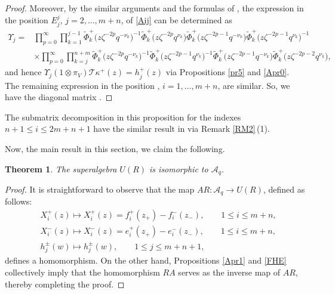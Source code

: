 \documentclass[pdftex]{sigma}
\numberwithin{equation}{section}
\newtheorem{Theorem}{Theorem}[section]
\begin{document}
\begin{proof}
Moreover, by the similar arguments and the formulas of ,
the expression in the position $E^j_j$, $j=2,\dots,m+n$, of \eqref{Aij} can be determined as
\begin{align*}
 \Upsilon_j={}&\prod\limits_{p=0}^{\infty}\prod\limits_{k=1}^{j-1}\widetilde{\Phi}^{+}_{k}\bigl(z\zeta^{-2p} q^{-\nu_k}\bigr)^{-1}\widetilde{\Phi}^{+}_{k}\bigl(z\zeta^{-2p} q^{\nu_k}\bigr)\widetilde{\Phi}^{+}_{k}\bigl(z\zeta^{-2p-1} q^{-\nu_k}\bigr)\widetilde{\Phi}^{+}_{k}\bigl(z\zeta^{-2p-1} q^{\nu_k}\bigr)^{-1}\\
&\times \prod\limits_{p=0}^{\infty}\prod\limits_{k=j}^{n+m}\widetilde{\Phi}^{+}_{k}\bigl(z\zeta^{-2p} q^{-\nu_k}\bigr)^{-1}\widetilde{\Phi}^{+}_{k}\bigl(z\zeta^{-2p-1} q^{\nu_k}\bigr)^{-1}\widetilde{\Phi}^{+}_{k}\bigl(z\zeta^{-2p-1} q^{-\nu_k}\bigr)\widetilde{\Phi}^{+}_{k}\bigl(z\zeta^{-2p-2} q^{\nu_k}\bigr),
\end{align*}
and hence
$\Upsilon_j(1\otimes\pi_V)\mathcal{T}\kappa^{+}(z)=h_j^{+}(z)
$
via Propositions \ref{pr5} and \ref{Apr0}.
The remaining expression in the position , $i=1,\dots,m+n$, are similar. So, we have the diagonal matrix .
\end{proof}

\begin{Remark}
The submatrix decomposition in this proposition for the indexes $n+1\leq i\leq 2m+n+1$ have the similar result in \cite{JMAB} via Remark \ref{RM2}\,(1).
\end{Remark}


Now, the main result in this section, we claim the following.

\begin{Theorem}\label{th4}
The superalgebra $U(R)$ is isomorphic to $\mathcal{A}_q$.
\end{Theorem}
\begin{proof}
It is straightforward to observe that the map $AR\colon \mathcal{A}_q\rightarrow U(R)$, defined as follows:
\begin{align*}
 &X_i^{+}(z)\mapsto X^{+}_i(z)=f^+_{i}(z_+)-f^-_{i}(z_-), \qquad 1\leq i\leq m+n,\\
 &X^{-}_i(z)\mapsto X^{-}_i(z)=e^+_{i}(z_+)-e^-_{i}(z_-),\qquad 1\leq i\leq m+n,\\
 &h_j^{\pm}(w)\mapsto h_j^{\pm}(w), \qquad 1\leq j\leq m+n+1,
\end{align*}
defines a homomorphism. On the other hand, Propositions \ref{Apr1} and \ref{FHE} collectively imply that the homomorphism $RA$ serves as the inverse map of $AR$, thereby completing the proof.
\end{proof}
\end{document}

